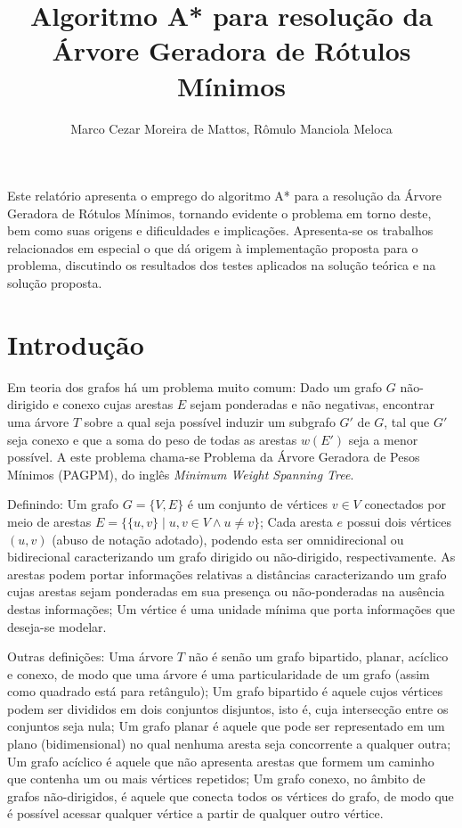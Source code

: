 \documentclass[12pt]{article}
\title{Algoritmo A* para resolução da Árvore Geradora de Rótulos Mínimos}
\author{Marco Cezar Moreira de Mattos\inst{1}, Rômulo Manciola Meloca\inst{1}}
\begin{document}
\maketitle

\begin{resumo}
	Este relatório apresenta o emprego do algoritmo A* para a resolução da Árvore Geradora de Rótulos Mínimos, tornando evidente o problema em torno deste, bem como suas origens e dificuldades e implicações. Apresenta-se os trabalhos relacionados em especial o que dá origem à implementação proposta para o problema, discutindo os resultados dos testes aplicados na solução teórica e na solução proposta.
\end{resumo}

\section{Introdução}\label{sec:introducao}

	Em teoria dos grafos há um problema muito comum: Dado um grafo $G$ não-dirigido e conexo cujas arestas $E$ sejam ponderadas e não negativas, encontrar uma árvore $T$ sobre a qual seja possível induzir um subgrafo $G'$ de $G$, tal que $G'$ seja conexo e que a soma do peso de todas as arestas $w(E')$ seja a menor possível. A este problema chama-se Problema da Árvore Geradora de Pesos Mínimos (PAGPM), do inglês \textit{Minimum Weight Spanning Tree}.

	Definindo: Um grafo $G = \{V, E\}$ é um conjunto de vértices $v \in V$ conectados por meio de arestas $E = \{\{u, v\} \mid u, v \in V \wedge u \neq v\}$; Cada aresta $e$ possui dois vértices $(u, v)$ (abuso de notação adotado), podendo esta ser omnidirecional ou bidirecional caracterizando um grafo dirigido ou não-dirigido, respectivamente. As arestas podem portar informações relativas a distâncias caracterizando um grafo cujas arestas sejam ponderadas em sua presença ou não-ponderadas na ausência destas informações; Um vértice é uma unidade mínima que porta informações que deseja-se modelar.

	Outras definições: Uma árvore $T$ não é senão um grafo bipartido, planar, acíclico e conexo, de modo que uma árvore é uma particularidade de um grafo (assim como quadrado está para retângulo); Um grafo bipartido é aquele cujos vértices podem ser divididos em dois conjuntos disjuntos, isto é, cuja intersecção entre os conjuntos seja nula; Um grafo planar é aquele que pode ser representado em um plano (bidimensional) no qual nenhuma aresta seja concorrente a qualquer outra; Um grafo acíclico é aquele que não apresenta arestas que formem um caminho que contenha um ou mais vértices repetidos; Um grafo conexo, no âmbito de grafos não-dirigidos, é aquele que conecta todos os vértices do grafo, de modo que é possível acessar qualquer vértice a partir de qualquer outro vértice.
\end{document}
